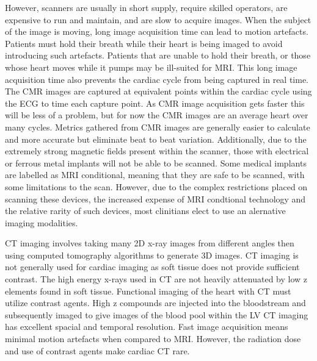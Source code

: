 \documentclass[12pt]{article}
\begin{document}
However, scanners are usually in short supply, require skilled operators, are expensive to run and maintain, and are slow to acquire images.
When the subject of the image is moving, long image acquisition time can lead to motion artefacts.
Patients must hold their breath while their heart is being imaged to avoid introducing such artefacts.
Patients that are unable to hold their breath, or those whose heart moves while it pumps may be ill-suited for MRI.
This long image acquisition time also prevents the cardiac cycle from being captured in real time.
The CMR images are captured at equivalent points within the cardiac cycle using the ECG to time each capture point.
As CMR image acquisition gets faster this will be less of a problem, but for now the CMR images are an average heart over many cycles.
Metrics gathered from CMR images are generally easier to calculate and more accurate but eliminate beat to beat variation.
Additionally, due to the extremely strong magnetic fields present within the scanner, those with electrical or ferrous metal implants will not be able to be scanned.
Some medical implants are labelled as MRI conditional, meaning that they are safe to be scanned, with some limitations to the scan.
However, due to the complex restrictions placed on scanning these devices, the increased expense of MRI condtional technology and the relative rarity of such devices, most clinitians elect to use an alernative imaging modalities.\cite{mri_implants}

CT imaging involves taking many 2D x-ray images from different angles then using computed tomography algorithms to generate 3D images.
CT imaging is not generally used for cardiac imaging as soft tissue does not provide sufficient contrast.
The high energy x-rays used in CT are not heavily attenuated by low z elements found in soft tissue.
Functional imaging of the heart with CT must utilize contrast agents\cite{ef_soa}.
High z compounds are injected into the bloodstream and subsequently imaged to give images of the blood pool within the LV
CT imaging has excellent spacial and temporal resolution. 
Fast image acquisition means minimal motion artefacts when compared to MRI.
However, the radiation dose and use of contrast agents make cardiac CT rare.

\end{document}
